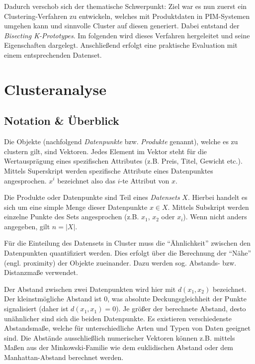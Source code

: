 Dadurch verschob sich der thematische Schwerpunkt: Ziel war es nun
zuerst ein Clustering-Verfahren zu entwickeln, welches mit Produktdaten
in PIM-Systemen umgehen kann und sinnvolle Cluster auf diesen generiert.
Dabei entstand der \emph{Bisecting K-Prototypes}. Im folgenden wird
dieses Verfahren hergeleitet und seine Eigenschaften dargelegt.
Anschließend erfolgt eine praktische Evaluation mit einem entsprechenden
Datenset.

\hypertarget{clusteranalyse}{%
\section{Clusteranalyse}\label{clusteranalyse}}

\hypertarget{notation-uxfcberblick}{%
\subsection{Notation \& Überblick}\label{notation-uxfcberblick}}

Die Objekte (nachfolgend \emph{Datenpunkte} bzw. \emph{Produkte}
genannt), welche es zu clustern gilt, sind Vektoren. Jedes Element im
Vektor steht für die Wertausprägung eines spezifischen Attributes (z.B.
Preis, Titel, Gewicht etc.). Mittels Superskript werden spezifische
Attribute eines Datenpunktes angesprochen. \(x^i\) bezeichnet also das
\(i\)-te Attribut von \(x\).

Die Produkte oder Datenpunkte sind Teil eines \emph{Datensets} \(X\).
Hierbei handelt es sich um eine simple Menge dieser Datenpunkte
\(x \in X\). Mittels Subskript werden einzelne Punkte des Sets
angesprochen (z.B. \(x_1\), \(x_2\) oder \(x_i\)). Wenn nicht anders
angegeben, gilt \(n=|X|\).

Für die Einteilung des Datensets in Cluster muss die ``Ähnlichkeit''
zwischen den Datenpunkten quantifiziert werden. Dies erfolgt über die
Berechnung der ``Nähe'' (engl. proximity) der Objekte zueinander. Dazu
werden sog. Abstands- bzw. Distanzmaße verwendet. \autocite[Kap. 1.2
Types of Data and How to Handle Them]{kaufman2009}

Der Abstand zwischen zwei Datenpunkten wird hier mit \(d(x_1,x_2)\)
bezeichnet. Der kleinstmögliche Abstand ist \(0\), was absolute
Deckungsgleichheit der Punkte signalisiert (daher ist
\(d(x_1,x_1) = 0\)). Je größer der berechnete Abstand, desto unähnlicher
sind sich die beiden Datenpunkte. Es existieren verschiedenste
Abstandsmaße, welche für unterschiedliche Arten und Typen von Daten
geeignet sind. Die Abstände ausschließlich numerischer Vektoren können
z.B. mittels Maßen aus der Minkowski-Familie wie dem euklidischen
Abstand oder dem Manhattan-Abstand berechnet werden. \autocite[Kap. 1.2
Types of Data and How to Handle Them]{kaufman2009}

